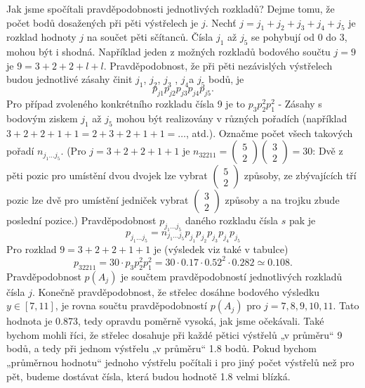 \begin{example}
  Jak jsme spočítali pravděpodobnosti jednotlivých rozkladů? Dejme tomu, že počet bodů dosažených 
  při pěti výstřelech je \(j\). Nechť \(j = j_1 + j_2 + j_3 + j_4 + j_5\) je rozklad hodnoty \(j\) 
  na součet pěti sčítanců. Čísla \(j_1\) až \(j_5\) se pohybují od \num{0} do \num{3}, mohou být i 
  shodná. Například jeden z možných rozkladů bodového součtu \(j = 9\) je \(9 = 3 + 2 + 2 + l + 
  l\). Pravděpodobnost, že při pěti nezávislých výstřelech budou jednotlivé zásahy činit \(j_1\), 
  \(j_2\), \(j_3\) , \(j_4\)a \(j_5\) bodů, je
  \begin{equation*}
    p_{j1}p_{j2}p_{j3}p_{j4}p_{j5}.
  \end{equation*}
  Pro případ zvoleného konkrétního rozkladu čísla \num{9} je to \(p_3p_2^2p_1^2\) - Zásahy s 
  bodovým ziskem \(j_1\) až \(j_5\) mohou být realizovány v různých pořadích (například \(\num{3} + 
  \num{2} + \num{2} + \num{1} + \num{1} = \num{2} + \num{3} + \num{2} + \num{1} + \num{1} 
  =\ldots\), atd.). Označme počet všech takových pořadí \(n_{j_1\ldots j_5}\). (Pro \(j = \num{3} + 
  \num{2} + \num{2} + \num{1} + \num{1}\) je \(n_{32211} = \begin{pmatrix} 5 \\ 2 
  \end{pmatrix}\begin{pmatrix} 3 \\ 2 \end{pmatrix} = 30\): Dvě z pěti pozic pro umístění dvou
  dvojek lze vybrat \(\begin{pmatrix} 5 \\ 2 \end{pmatrix}\)  způsoby, ze zbývajících tří pozic lze 
  dvě pro umístění jedniček vybrat \(\begin{pmatrix} 3 \\ 2 \end{pmatrix}\) způsoby a na
  trojku zbude poslední pozice.) Pravděpodobnost \(p_{j_1\ldots j_5}\) daného rozkladu čísla \(s\) 
  pak je
  \begin{equation*}
    p_{j_1\ldots j_5} = n_{j_1\ldots j_5}p_{j_1}p_{j_2}p_{j_3}p_{j_4}p_{j_5}
  \end{equation*}
  Pro rozklad \(\num{9} = \num{3} + \num{2} + \num{2} + \num{1} + \num{1}\) je (výsledek viz také v 
  tabulce)
  \begin{equation*}
    p_{32211} =30\cdot p_3p_2^2p_1^2 = \num{30}\cdot\num{0.17}\cdot\num{0.52}^2\cdot\num{0,282} 
              \simeq \num{0.108}.
  \end{equation*}
  Pravděpodobnost \(p(A_j)\) je součtem pravděpodobností jednotlivých rozkladů čísla \(j\). Konečně 
  pravděpodobnost, že střelec dosáhne bodového výsledku \(y \in [7, 11]\), je rovna součtu 
  pravděpodobností \(p(A_j)\) pro \(j = 7, 8, 9, 10, 11\). Tato hodnota je \num{0.873}, tedy 
  opravdu poměrně vysoká, jak jsme očekávali. Také bychom mohli říci, že střelec dosahuje při každé 
  pětici výstřelů „v průměru“ \num{9} bodů, a tedy při jednom výstřelu „v průměru“ \num{1.8} bodů. 
  Pokud bychom „průměrnou hodnotu“ jednoho výstřelu počítali i pro jiný počet výstřelů než pro pět, 
  budeme dostávat čísla, která budou hodnotě \num{1.8} velmi blízká.
\normalsize
\end{example}